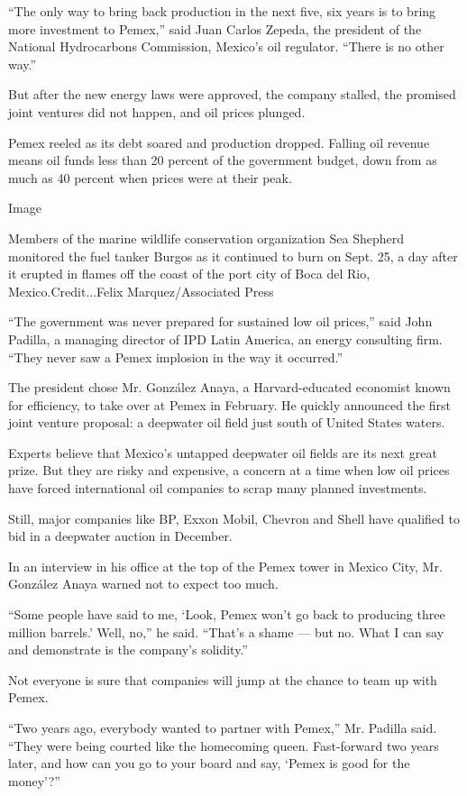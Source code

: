 ``The only way to bring back production in the next five, six years is
to bring more investment to Pemex,'' said Juan Carlos Zepeda, the
president of the National Hydrocarbons Commission, Mexico's oil
regulator. ``There is no other way.''

But after the new energy laws were approved, the company stalled, the
promised joint ventures did not happen, and oil prices plunged.

Pemex reeled as its debt soared and production dropped. Falling oil
revenue means oil funds less than 20 percent of the government budget,
down from as much as 40 percent when prices were at their peak.

Image

Members of the marine wildlife conservation organization Sea Shepherd
monitored the fuel tanker Burgos as it continued to burn on Sept. 25, a
day after it erupted in flames off the coast of the port city of Boca
del Rio, Mexico.Credit...Felix Marquez/Associated Press

``The government was never prepared for sustained low oil prices,'' said
John Padilla, a managing director of IPD Latin America, an energy
consulting firm. ``They never saw a Pemex implosion in the way it
occurred.''

The president chose Mr. González Anaya, a Harvard-educated economist
known for efficiency, to take over at Pemex in February. He quickly
announced the first joint venture proposal: a deepwater oil field just
south of United States waters.

Experts believe that Mexico's untapped deepwater oil fields are its next
great prize. But they are risky and expensive, a concern at a time when
low oil prices have forced international oil companies to scrap many
planned investments.

Still, major companies like BP, Exxon Mobil, Chevron and Shell have
qualified to bid in a deepwater auction in December.

In an interview in his office at the top of the Pemex tower in Mexico
City, Mr. González Anaya warned not to expect too much.

``Some people have said to me, `Look, Pemex won't go back to producing
three million barrels.' Well, no,'' he said. ``That's a shame --- but
no. What I can say and demonstrate is the company's solidity.''

Not everyone is sure that companies will jump at the chance to team up
with Pemex.

``Two years ago, everybody wanted to partner with Pemex,'' Mr. Padilla
said. ``They were being courted like the homecoming queen. Fast-forward
two years later, and how can you go to your board and say, `Pemex is
good for the money'?''

